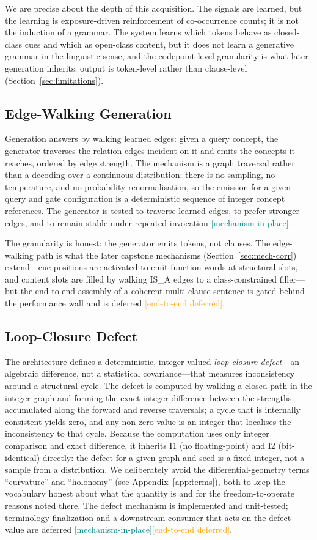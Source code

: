 \documentclass[11pt,a4paper]{article}
\newcommand{\statusmech}{\textcolor{teal}{\small\textsf{[mechanism-in-place]}}}
\newcommand{\statusdeferred}{\textcolor{orange}{\small\textsf{[end-to-end deferred]}}}
\begin{document}
We are precise about the depth of this acquisition. The signals are
learned, but the learning is exposure-driven reinforcement of
co-occurrence counts; it is not the induction of a grammar. The system
learns which tokens behave as closed-class cues and which as open-class
content, but it does not learn a generative grammar in the linguistic
sense, and the codepoint-level granularity is what later generation
inherits: output is token-level rather than clause-level
(Section~\ref{sec:limitations}).

\subsection{Edge-Walking Generation}
Generation answers by walking learned edges: given a query concept, the
generator traverses the relation edges incident on it and emits the
concepts it reaches, ordered by edge strength. The mechanism is a graph
traversal rather than a decoding over a continuous distribution: there is
no sampling, no temperature, and no probability renormalisation, so the
emission for a given query and gate configuration is a deterministic
sequence of integer concept references. The generator is tested to
traverse learned edges, to prefer stronger edges, and to remain stable
under repeated invocation \statusmech.

The granularity is honest: the generator emits tokens, not clauses. The
edge-walking path is what the later capstone mechanisms
(Section~\ref{sec:mech-corr}) extend---cue positions are activated to
emit function words at structural slots, and content slots are filled by
walking IS\_A edges to a class-constrained filler---but the end-to-end
assembly of a coherent multi-clause sentence is gated behind the
performance wall and is deferred \statusdeferred.

\subsection{Loop-Closure Defect}
The architecture defines a deterministic, integer-valued
\emph{loop-closure defect}---an algebraic difference, not a statistical
covariance---that measures inconsistency around a structural cycle. The
defect is computed by walking a closed path in the integer graph and
forming the exact integer difference between the strengths accumulated
along the forward and reverse traversals; a cycle that is internally
consistent yields zero, and any non-zero value is an integer that
localises the inconsistency to that cycle. Because the computation uses
only integer comparison and exact difference, it inherits I1
(no floating-point) and I2 (bit-identical) directly: the defect for a
given graph and seed is a fixed integer, not a sample from a
distribution. We deliberately avoid the differential-geometry terms
``curvature'' and ``holonomy'' (see Appendix~\ref{app:terms}), both to
keep the vocabulary honest about what the quantity is and for the
freedom-to-operate reasons noted there. The defect mechanism is
implemented and unit-tested; terminology finalization and a downstream
consumer that acts on the defect value are deferred \statusmech\statusdeferred.
\end{document}
